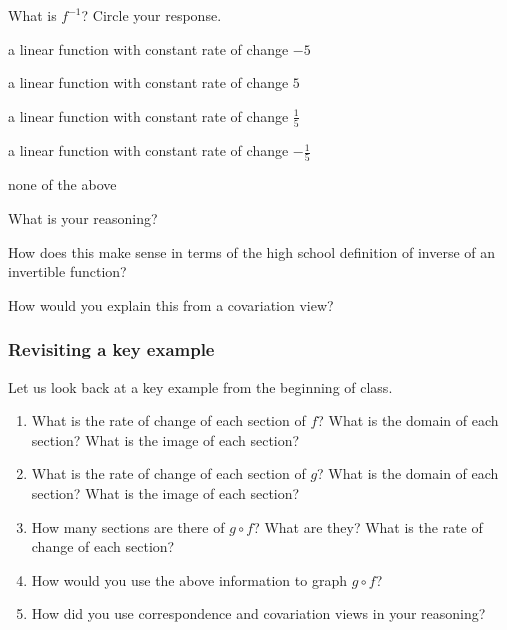 \documentclass[11pt]{article}
\newcommand{\handout}{\subsubsection}
\theoremstyle{definition}
\begin{document}
\begin{enumerate}
What is $f^{-1}$? Circle your response. 
	\begin{center}
	a linear function with constant rate of change $-5$   
		
	a linear function with constant rate of change $5$  
	
	a linear function with constant rate of change $\frac{1}{5}$ 
	
	a linear function with constant rate of change $-\frac{1}{5}$ 
		
	none of the above
	\end{center}
What is your reasoning?

How does this make sense in terms of the high school definition of inverse of an invertible function?

How would you explain this from a covariation view? 

\end{enumerate}

\newpage
\handout{Revisiting a key example}


Let us look back at a key example from the beginning of class. 

\begin{center}
\end{center}

\begin{enumerate}
\item What is the rate of change of each section of $f$? What is the domain of each section?
 What is the image of each section?

\item What is the rate of change of each section of $g$? What is the domain of each section?  What is the image of each section?

\item How many sections are there of $g\circ f$? What are they? What is the rate of change of each section?

\item How would you use the above information to graph $g\circ f$?

\item How did you use correspondence and covariation views in your reasoning?
\end{enumerate}
\end{document}
